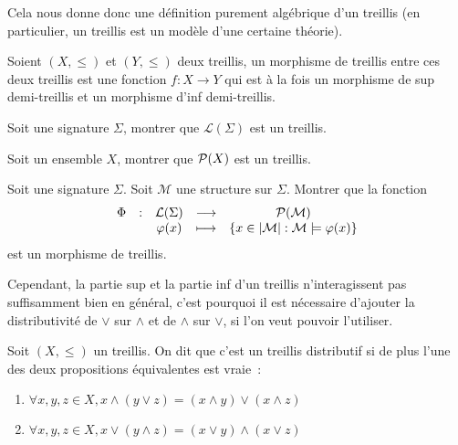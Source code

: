 Cela nous donne donc une définition purement algébrique d'un treillis (en
particulier, un treillis est un modèle d'une certaine théorie).

\begin{definition}
  Soient $(X,\leq)$ et $(Y,\leq)$ deux treillis, un morphisme de treillis entre
  ces deux treillis est une fonction $f : X \to Y$ qui est à la fois un
  morphisme de sup demi-treillis et un morphisme d'inf demi-treillis.
\end{definition}

\begin{exercise}
  Soit une signature $\Sigma$, montrer que $\mathcal L(\Sigma)$ est un treillis.
\end{exercise}

\begin{exercise}
  Soit un ensemble $X$, montrer que $\mathcal{P} (X)$ est un treillis.
\end{exercise}

\begin{exercise}
  Soit une signature $\Sigma$. Soit $\mathcal M$ une structure sur $\Sigma$.
  Montrer que la fonction
  \[\begin{array}{ccccc}
  \Phi & : & \mathcal L(\Sigma) & \longrightarrow &
  \mathcal{P}(\mathcal M)\\
  & & \varphi(x) & \longmapsto &
  \{x \in |\mathcal M| : \mathcal M\models \varphi(x)\}
  \end{array}\]
  est un morphisme de treillis.
\end{exercise}

Cependant, la partie sup et la partie inf d'un treillis n'interagissent pas
suffisamment bien en général, c'est pourquoi il est nécessaire d'ajouter la
distributivité de $\lor$ sur $\land$ et de $\land$ sur $\lor$, si l'on veut
pouvoir l'utiliser.

\begin{definition}
  Soit $(X,\leq)$ un treillis. On dit que c'est un treillis distributif si de
  plus l'une des deux propositions équivalentes est vraie~:
  \begin{enumerate}[label=(\roman*)]
  \item \label{enum.tr.distr1}
    $\forall x,y,z\in X, x\land (y\lor z) = (x\land y)\lor (x\land z)$
  \item \label{enum.tr.distr2}
    $\forall x,y,z\in X, x\lor (y\land z) = (x\lor y)\land (x\lor z)$
  \end{enumerate}
\end{definition}

